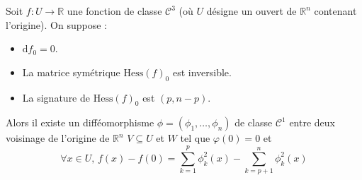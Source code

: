   \begin{lemma}[Morse]
    \label{lemme-de-morse-2}
    Soit $f : U \rightarrow \mathbb{R}$ une fonction de classe $\mathcal{C}^3$ (où $U$ désigne un ouvert de $\mathbb{R}^n$ contenant l'origine). On suppose :
    \begin{itemize}
      \item $\mathrm{d} f_0 = 0$.
      \item La matrice symétrique $\mathrm{Hess} (f)_0$ est inversible.
      \item La signature de $\mathrm{Hess}(f)_0$ est $(p, n-p)$.
    \end{itemize}
    Alors il existe un difféomorphisme $\phi = (\phi_1, \dots, \phi_n)$ de classe $\mathcal{C}^1$ entre deux voisinage de l'origine de $\mathbb{R}^n$ $V \subseteq U$ et $W$ tel que $\varphi(0) = 0$ et
    \[ \forall x \in U, \, f(x) - f(0) = \sum_{k=1}^p \phi_k^2(x) - \sum_{k=p+1}^n \phi_k^2(x) \]
  \end{lemma}

